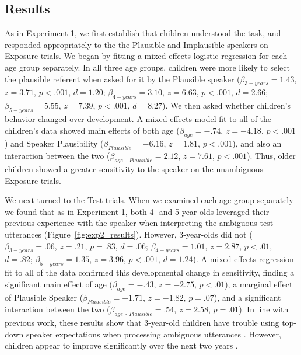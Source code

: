 \documentclass[man,floatsintext]{apa6}
\begin{document}
\subsection{Results}

As in Experiment 1, we first establish that children understood the task, and responded appropriately to the  the Plausible and Implausible speakers on Exposure trials. We began by fitting a mixed-effects logistic regression for each age group separately. In all three age groups, children were more likely to select the plausible referent when asked for it by the Plausible speaker ($\beta_{3-years} = 1.43$, $z = 3.71$, $p < .001$, $d = 1.20$; $\beta_{4-years} = 3.10$, $z = 6.63$, $p < .001$, $d = 2.66$; $\beta_{5-years} = 5.55$, $z = 7.39$, $p < .001$, $d = 8.27$). We then asked whether children's behavior changed over development. A mixed-effects model fit to all of the children's data showed main effects of both age ($\beta_{age} = -.74$, $z = -4.18$, $p < .001$) and Speaker Plausibility ($\beta_{Plausible} = -6.16$, $z = 1.81$, $p < .001$), and also an interaction between the two ($\beta_{age \: \cdot \: Plausible} = 2.12$, $z = 7.61$, $p < .001$). Thus, older children showed a greater sensitivity to the speaker on the unambiguous Exposure trials.

We next turned to the Test trials. When we examined each age group separately we found that as in Experiment 1, both 4- and 5-year olds leveraged their previous experience with the speaker when interpreting the ambiguous test utterances (Figure~\ref{fig:exp2_results}). However, 3-year-olds did not ($\beta_{3-years} = .06$, $z = .21$, $p  = .83$, $d = .06$; $\beta_{4-years} = 1.01$, $z = 2.87$, $p < .01$, $d = .82$; $\beta_{5-years} = 1.35$, $z = 3.96$, $p < .001$, $d = 1.24$). A mixed-effects regression fit to all of the data confirmed this developmental change in sensitivity, finding a significant main effect of age ($\beta_{age} = -.43$, $z = -2.75$, $p < .01$), a marginal effect of Plausible Speaker ($\beta_{Plausible} = -1.71$, $z = -1.82$, $p = .07$), and a significant interaction between the two ($\beta_{age \: \cdot \: Plausible} = .54$, $z = 2.58$, $p = .01$). In line with previous work, these results show that 3-year-old children have trouble using top-down speaker expectations when processing ambiguous utterances \cite{kidd2005}. However, children appear to improve significantly over the next two years \cite{rabagliati2013}.
\end{document}
